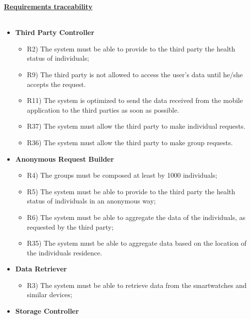 	\underline{\textbf{Requirements traceability}}\\\\
	\begin{itemize}
		\item \textbf{Third Party Controller}
		\begin{itemize}
			\item R2) The system must be able to provide to the third party the health status of individuals;
			\item R9) The third party is not allowed to access the user’s data until he/she accepts the request.\\
			\item R11) The system is optimized to send the data received from the mobile application to the third parties as soon as possible.\\
			\item R37) The system must allow the third party to make individual requests.\\
			\item R36) The system must allow the third party to make group requests.\\
		\end{itemize}
		\item \textbf{Anonymous Request Builder}
		\begin{itemize}
			\item R4) The groups must be composed at least by 1000 individuals;\\
			\item R5) The system must be able to provide to the third party the health status of individuals in an anonymous way;\\
			\item R6) The system must be able to aggregate the data of the individuals, as requested by the third party;\\
			\item R35) The system must be able to aggregate data based on the location of the individuals residence.\\
		\end{itemize}
		\item \textbf{Data Retriever}
		\begin{itemize}
			\item R3) The system must be able to retrieve data from the smartwatches and similar devices;\\
		\end{itemize}
		\item \textbf{Storage Controller}

\end{itemize}
